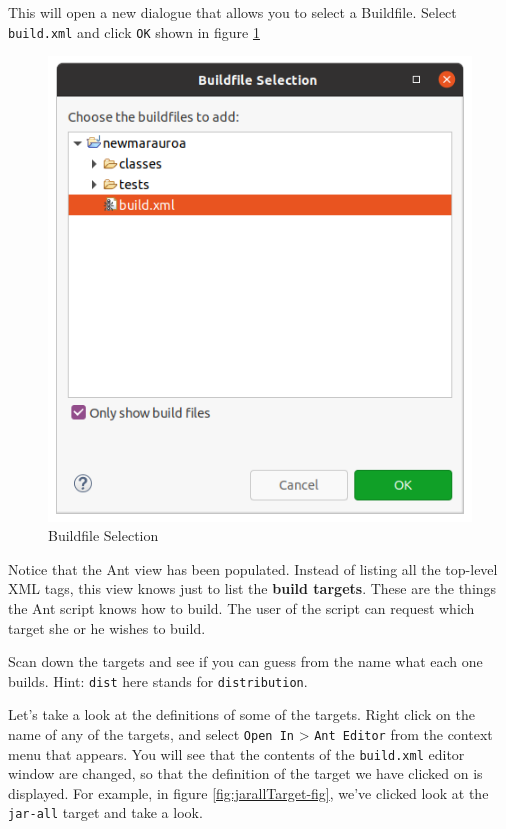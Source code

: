 \documentclass[
]{book}
\begin{document}
This will open a new dialogue that allows you to select a Buildfile. Select \texttt{build.xml} and click \texttt{OK} shown in figure \ref{fig:selectBuildfile-fig}

\begin{figure}

{\centering \includegraphics[width=1\linewidth]{images/2.1selectBuildfile} 

}

\caption{Buildfile Selection}\label{fig:selectBuildfile-fig}
\end{figure}

Notice that the Ant view has been populated. Instead of listing all the top-level XML tags, this view knows just to list the \textbf{build targets}. These are the things the Ant script knows how to build. The user of the script can request which target she or he wishes to build.

Scan down the targets and see if you can guess from the name what each one builds. Hint: \texttt{dist} here stands for \texttt{distribution}.

Let's take a look at the definitions of some of the targets. Right click on the name of any of the targets, and select \texttt{Open\ In} \textgreater{} \texttt{Ant\ Editor} from the context menu that appears. You will see that the contents of the \texttt{build.xml} editor window are changed, so that the definition of the target we have clicked on is displayed. For example, in figure \ref{fig:jarallTarget-fig}, we've clicked look at the \texttt{jar-all} target and take a look.
\end{document}
